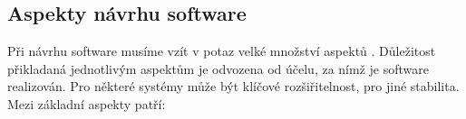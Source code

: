 
\subsection{Aspekty návrhu software}
Při návrhu software musíme vzít v potaz velké množství aspektů \cite{wiki:software_design}. Důležitost přikladaná jednotlivým aspektům je odvozena od účelu, za nímž je software realizován. Pro některé systémy může být klíčové rozšiřitelnost, pro jiné stabilita. Mezi základní aspekty patří:

